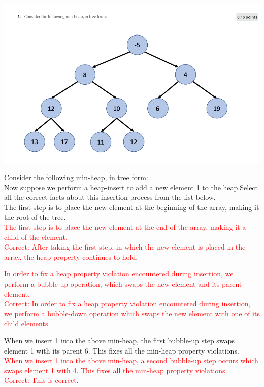 \documentclass{article}
\begin{document}
\includegraphics[width=\textwidth]{heapsortquestion1chart.png}



Consider the following min-heap, in tree form:\\
Now suppose we perform a heap-insert to add a new element 1 to the heap.Select all the correct facts about this insertion process from the list below.\\

The first step is to place the new element at the beginning of the array, making it the root of the tree.\\

\textcolor{red}{The first step is to place the new element at the end of the array, making it a child of the element.\\
Correct: After taking the first step, in which the new element is placed in the array, the heap property continues to hold.\\}

\textcolor{red}{In order to fix a heap property violation encountered during insertion, we perform a bubble-up operation, which swaps the new element and its parent element.\\
Correct: In order to fix a heap property violation encountered during insertion, we perform a bubble-down operation which swaps the new element with one of its child elements.\\}

When we insert 1 into the above min-heap, the first bubble-up step swaps element 1 with its parent 6.  This fixes all the min-heap property violations.\\

\textcolor{red}{When we insert 1 into the above min-heap, a second bubble-up step occurs which swaps element 1 with 4.  This fixes all the min-heap property violations.\\
Correct: This is correct.\\}
\end{document}
